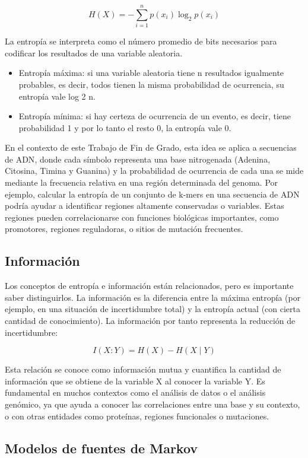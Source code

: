 \documentclass[11pt,spanish,listoffigures,listoftables]{tfgetsinf}
\begin{document}
\[
H(X) = - \sum_{i=1}^{n} p(x_i) \log_2 p(x_i)
\]

La entropía se interpreta como el número promedio de bits necesarios para codificar los resultados de una variable aleatoria. 

\begin{itemize}
   \item Entropía máxima: si una variable aleatoria tiene n resultados igualmente probables, es decir, todos tienen la misma probabilidad de ocurrencia, su entropía vale log 2 n. 
   \item Entropía mínima: si hay certeza de ocurrencia de un evento, es decir, tiene probabilidad 1 y por lo tanto el resto 0, la entropía vale 0.
\end{itemize}
 
En el contexto de este Trabajo de Fin de Grado, esta idea se aplica a secuencias de \ac{ADN}, donde cada símbolo representa una base nitrogenada (Adenina, Citosina, Timina y Guanina) y la probabilidad de ocurrencia de cada una se mide mediante la frecuencia relativa en una región determinada del genoma. Por ejemplo, calcular la entropía de un conjunto de k-mers en una secuencia de \ac{ADN} podría ayudar a identificar regiones altamente conservadas o variables. Estas regiones pueden correlacionarse con funciones biológicas importantes, como promotores, regiones reguladoras, o sitios de mutación frecuentes. 

\subsection{Información}

Los conceptos de entropía e información están relacionados, pero es importante saber distinguirlos. La información es la diferencia entre la máxima entropía (por ejemplo, en una situación de incertidumbre total) y la entropía actual (con cierta cantidad de conocimiento). La información por tanto representa la reducción de incertidumbre:

\[
I(X:Y) = H(X) - H(X \mid Y)
\]

Esta relación se conoce como información mutua y cuantifica la cantidad de información que se obtiene de la variable X al conocer la variable Y. Es fundamental en muchos contextos como el análisis de datos o el análisis genómico, ya que ayuda a conocer las correlaciones entre una base y su contexto, o con otras entidades como proteínas, regiones funcionales o mutaciones. 


\subsection{Modelos de fuentes de Markov}
\end{document}

